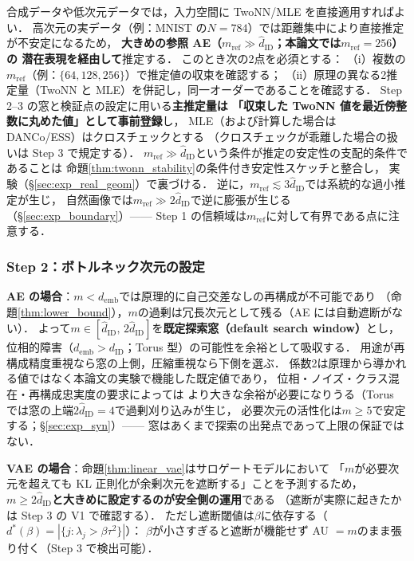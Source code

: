 \documentclass[11pt,a4paper]{jsarticle}
\newcommand{\dID}{d_{\mathrm{ID}}}
\newcommand{\hatdID}{\hat{d}_{\mathrm{ID}}}
\newcommand{\demb}{d_{\mathrm{emb}}}
\newcommand{\dstar}{d^{*}(\beta)}
\begin{document}
合成データや低次元データでは，入力空間に TwoNN/MLE を直接適用すればよい．
高次元の実データ（例：MNIST の$N = 784$）では距離集中により直接推定が不安定になるため，
\textbf{大きめの参照 AE（$m_{\mathrm{ref}} \gg \hatdID$；本論文では$m_{\mathrm{ref}} = 256$）の
潜在表現を経由して}推定する．
このとき次の2点を必須とする：
（i）複数の$m_{\mathrm{ref}}$（例：$\{64, 128, 256\}$）で推定値の収束を確認する；
（ii）原理の異なる2推定量（TwoNN と MLE）を併記し，同一オーダーであることを確認する．
Step 2--3 の窓と検証点の設定に用いる\textbf{主推定量は
「収束した TwoNN 値を最近傍整数に丸めた値」として事前登録}し，
MLE（および計算した場合は DANCo/ESS）はクロスチェックとする
（クロスチェックが乖離した場合の扱いは Step 3 で規定する）．
$m_{\mathrm{ref}} \gg \hatdID$という条件が推定の安定性の支配的条件であることは
命題\ref{thm:twonn_stability}の条件付き安定性スケッチと整合し，
実験（§\ref{sec:exp_real_geom}）で裏づける．
逆に，$m_{\mathrm{ref}} \lesssim 3\hatdID$では系統的な過小推定が生じ，
自然画像では$m_{\mathrm{ref}} \gg 2\hatdID$で逆に膨張が生じる（§\ref{sec:exp_boundary}）——
Step 1 の信頼域は$m_{\mathrm{ref}}$に対して有界である点に注意する．

\subsubsection{Step 2：ボトルネック次元の設定}\label{sec:protocol_s2}

\textbf{AE の場合}：$m < \demb$では原理的に自己交差なしの再構成が不可能であり
（命題\ref{thm:lower_bound}），$m$の過剰は冗長次元として残る（AE には自動遮断がない）．
よって$m \in [\hatdID,\, 2\hatdID]$を\textbf{既定探索窓（default search window）}とし，
位相的障害（$\demb > \dID$；Torus 型）の可能性を余裕として吸収する．
用途が再構成精度重視なら窓の上側，圧縮重視なら下側を選ぶ．
係数2は原理から導かれる値ではなく本論文の実験で機能した既定値であり，
位相・ノイズ・クラス混在・再構成忠実度の要求によっては
より大きな余裕が必要になりうる（Torus では窓の上端$2\hatdID = 4$で過剰刈り込みが生じ，
必要次元の活性化は$m \geq 5$で安定する；§\ref{sec:exp_syn}）——
窓はあくまで探索の出発点であって上限の保証ではない．

\textbf{VAE の場合}：命題\ref{thm:linear_vae}はサロゲートモデルにおいて
「$m$が必要次元を超えても KL 正則化が余剰次元を遮断する」ことを予測するため，
\textbf{$m \geq 2\hatdID$と大きめに設定するのが安全側の運用}である
（遮断が実際に起きたかは Step 3 の V1 で確認する）．
ただし遮断閾値は$\beta$に依存する（$\dstar = |\{j : \lambda_j > \beta\tau^2\}|$）：
$\beta$が小さすぎると遮断が機能せず AU $= m$のまま張り付く（Step 3 で検出可能）．
\end{document}
